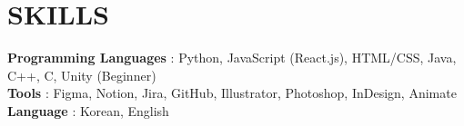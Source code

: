 \documentclass[letterpaper,11pt]{article}
\begin{document}
%
\section{SKILLS}
 \begin{itemize}[leftmargin=0in, label={}]
    \small{\item{
     \textbf{Programming Languages} {: Python, JavaScript (React.js), HTML/CSS, Java, C++, C, Unity (Beginner)}\vspace{2pt} \\
     \textbf{Tools}     {: Figma, Notion, Jira, GitHub, Illustrator, Photoshop, InDesign, Animate}\vspace{2pt} \\
     \textbf{Language}     {: Korean, English}
    }}
 \end{itemize}


\end{document}
